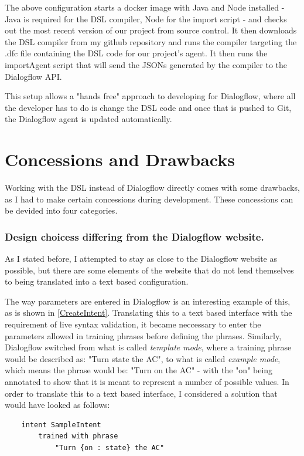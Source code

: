 The above configuration starts a docker image with Java and Node installed - Java is required for the DSL compiler, Node for the import script - and checks out the most recent version of our project from source control.
It then downloads the DSL compiler from my github repository and runs the compiler targeting the .dfc file containing the DSL code for our project's agent.
It then runs the importAgent script that will send the JSONs generated by the compiler to the Dialogflow API.

This setup allows a "hands free" approach to developing for Dialogflow, where all the developer has to do is change the DSL code and once that is pushed to Git, the Dialogflow agent is updated automatically.


\section{Concessions and Drawbacks}

Working with the DSL instead of Dialogflow directly comes with some drawbacks, as I had to make certain concessions during development. 
These concessions can be devided into four categories.

\subsubsection{Design choicess differing from the Dialogflow website.}
As I stated before, I attempted to stay as close to the Dialogflow website as possible, but there are some elements of the website that do not lend themselves to being translated into a text based configuration.

The way parameters are entered in Dialogflow is an interesting example of this, as is shown in \autoref{CreateIntent}. Translating this to a text based interface with the requirement of live syntax validation, it became neccessary to enter the parameters allowed in training phrases before defining the phrases.
Similarly, Dialogflow switched from what is called \textit{template mode}, where a training phrase would be described as: "Turn state the AC", to what is called \textit{example mode}, which means the phrase would be: "Turn on the AC" - with the "on" being annotated to show that it is meant to represent a number of possible values.
In order to translate this to a text based interface, I considered a solution that would have looked as follows:

\begin{verbatim}
    intent SampleIntent
        trained with phrase
            "Turn {on : state} the AC"
\end{verbatim}

